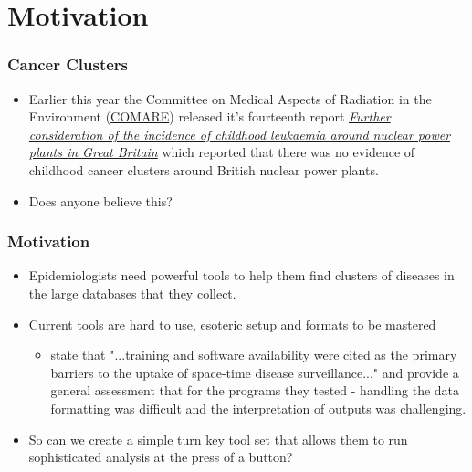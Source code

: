 \documentclass{beamer}
\begin{document}
\section{Motivation}
\begin{frame}[t]
\frametitle{Cancer Clusters}
\begin{itemize}
\item Earlier this year the Committee on Medical Aspects of Radiation in the Environment
(\href{http://www.comare.org.uk/}{COMARE}) released it's fourteenth report \href{http://www.comare.org.uk/press_releases/documents/COMARE14report.pdf}{\textit{
Further consideration of the incidence of childhood leukaemia around
nuclear power plants in Great Britain}} which reported that there was no evidence of childhood cancer clusters around British nuclear power plants.
\item Does anyone believe this?
\end{itemize}
\end{frame}
\begin{frame}[t]
\frametitle{Motivation}

\begin{itemize}
\item Epidemiologists need powerful tools to help them find clusters of diseases in the large databases that they collect.
\item Current tools are hard to use, esoteric setup and formats to be mastered
\begin{itemize}
\item \citet{citeulike:6854836} state that "...training and software availability were cited as the primary barriers to the uptake of space-time disease surveillance..." and provide a general assessment that for the programs they tested - handling the data formatting was difficult and the interpretation of outputs was challenging.
\end{itemize}
\item So can we create a simple turn key tool set that allows them to run sophisticated analysis at the press of a button?
\end{itemize}
\end{frame}
\end{document}
